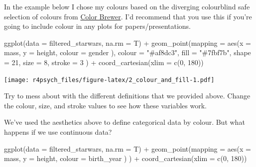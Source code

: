 \documentclass[
]{book}
\newenvironment{Shaded}{\begin{snugshade}}{\end{snugshade}}
\newcommand{\AttributeTok}[1]{\textcolor[rgb]{0.77,0.63,0.00}{#1}}
\newcommand{\DecValTok}[1]{\textcolor[rgb]{0.00,0.00,0.81}{#1}}
\newcommand{\FunctionTok}[1]{\textcolor[rgb]{0.00,0.00,0.00}{#1}}
\newcommand{\NormalTok}[1]{#1}
\newcommand{\SpecialCharTok}[1]{\textcolor[rgb]{0.00,0.00,0.00}{#1}}
\newcommand{\StringTok}[1]{\textcolor[rgb]{0.31,0.60,0.02}{#1}}
\begin{document}
In the example below I chose my colours based on the diverging colourblind safe selection of colours from \href{http://colorbrewer2.org/\#type=sequential\&scheme=BuGn\&n=3}{Color Brewer}. I'd recommend that you use this if you're going to include colour in any plots for papers/presentations.

\begin{Shaded}
\begin{Highlighting}[]
\FunctionTok{ggplot}\NormalTok{(}\AttributeTok{data =}\NormalTok{ filtered\_starwars, }\AttributeTok{na.rm =}\NormalTok{ T) }\SpecialCharTok{+}
  \FunctionTok{geom\_point}\NormalTok{(}\AttributeTok{mapping =} \FunctionTok{aes}\NormalTok{(}\AttributeTok{x =}\NormalTok{ mass, }
                           \AttributeTok{y =}\NormalTok{ height, }
                           \AttributeTok{colour =}\NormalTok{ gender}
\NormalTok{                           ),}
             \AttributeTok{colour =} \StringTok{"\#af8dc3"}\NormalTok{,}
             \AttributeTok{fill =} \StringTok{"\#7fbf7b"}\NormalTok{,}
             \AttributeTok{shape =} \DecValTok{21}\NormalTok{,}
             \AttributeTok{size =} \DecValTok{8}\NormalTok{,}
             \AttributeTok{stroke =} \DecValTok{3}
\NormalTok{             ) }\SpecialCharTok{+}
  \FunctionTok{coord\_cartesian}\NormalTok{(}\AttributeTok{xlim =} \FunctionTok{c}\NormalTok{(}\DecValTok{0}\NormalTok{, }\DecValTok{180}\NormalTok{))}
\end{Highlighting}
\end{Shaded}

\texttt{[image: r4psych\_files/figure-latex/2\_colour\_and\_fill-1.pdf]}

Try to mess about with the different definitions that we provided above. Change the colour, size, and stroke values to see how these variables work.

We've used the aesthetics above to define categorical data by colour. But what happens if we use continuous data?

\begin{Shaded}
\begin{Highlighting}[]
\FunctionTok{ggplot}\NormalTok{(}\AttributeTok{data =}\NormalTok{ filtered\_starwars, }\AttributeTok{na.rm =}\NormalTok{ T) }\SpecialCharTok{+}
  \FunctionTok{geom\_point}\NormalTok{(}\AttributeTok{mapping =} \FunctionTok{aes}\NormalTok{(}\AttributeTok{x =}\NormalTok{ mass, }
                           \AttributeTok{y =}\NormalTok{ height, }
                           \AttributeTok{colour =}\NormalTok{ birth\_year}
\NormalTok{                           )}
\NormalTok{             ) }\SpecialCharTok{+}
  \FunctionTok{coord\_cartesian}\NormalTok{(}\AttributeTok{xlim =} \FunctionTok{c}\NormalTok{(}\DecValTok{0}\NormalTok{, }\DecValTok{180}\NormalTok{))}
\end{Highlighting}
\end{Shaded}
\end{document}
